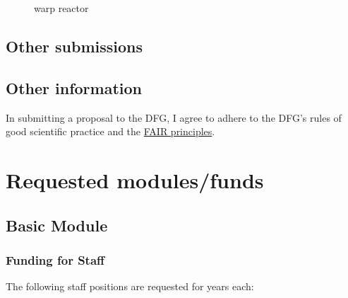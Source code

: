 \documentclass{scrartcl}
\begin{document}
\begin{figure}
\centering
{}
\caption{warp reactor}
\label{fig:some_nice_graph}
\end{figure}

\subsection{Other submissions}

\subsection{Other information}
In submitting a proposal to the DFG, I agree to adhere to the DFG's rules of good scientific practice and the \href{https://www.nature.com/articles/sdata201618}{FAIR principles}.

\section{Requested modules/funds}

\subsection{Basic Module}

\subsubsection{Funding for Staff}
\begin{funds}
The following staff positions are requested for  years each:


\end{funds}
\end{document}
